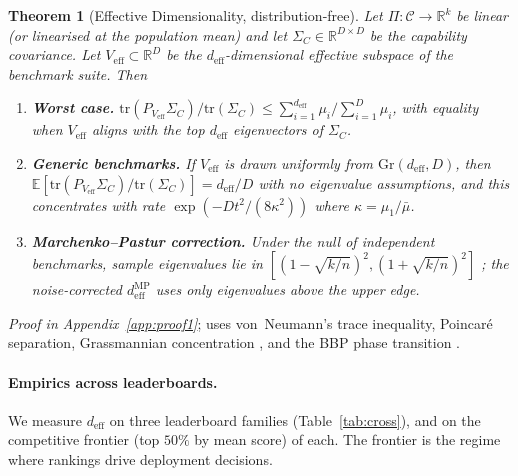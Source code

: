 \documentclass{article}
\newtheorem{theorem}{Theorem}
\begin{document}
\begin{theorem}[Effective Dimensionality, distribution-free]
\label{thm:body:deff}
Let $\Pi : \mathcal{C} \to \mathbb{R}^k$ be linear (or linearised at the
population mean) and let $\Sigma_C \in \mathbb{R}^{D \times D}$ be the
capability covariance. Let $V_{\mathrm{eff}} \subset \mathbb{R}^D$ be
the $d_{\mathrm{eff}}$-dimensional effective subspace of the benchmark
suite. Then
\begin{enumerate}[label=(\alph*), leftmargin=1.5em, itemsep=1pt]
  \item \textbf{Worst case.}
        $\mathrm{tr}(P_{V_{\mathrm{eff}}} \Sigma_C) / \mathrm{tr}(\Sigma_C)
        \le \sum_{i=1}^{d_{\mathrm{eff}}} \mu_i / \sum_{i=1}^D \mu_i$,
        with equality when $V_{\mathrm{eff}}$ aligns with the top
        $d_{\mathrm{eff}}$ eigenvectors of $\Sigma_C$.
  \item \textbf{Generic benchmarks.} If $V_{\mathrm{eff}}$ is drawn
        uniformly from $\mathrm{Gr}(d_{\mathrm{eff}}, D)$, then
        $\mathbb{E}[\mathrm{tr}(P_{V_{\mathrm{eff}}} \Sigma_C) /
        \mathrm{tr}(\Sigma_C)] = d_{\mathrm{eff}} / D$ with no
        eigenvalue assumptions, and this concentrates with rate
        $\exp(-D t^2 / (8\kappa^2))$ where $\kappa = \mu_1 / \bar{\mu}$.
  \item \textbf{Marchenko--Pastur correction.} Under the null of
        independent benchmarks, sample eigenvalues lie in
        $[(1 - \sqrt{k/n})^2, (1 + \sqrt{k/n})^2]$
        \citep{marchenko1967distribution}; the noise-corrected
        $d_{\mathrm{eff}}^{\mathrm{MP}}$ uses only eigenvalues above
        the upper edge.
\end{enumerate}
\end{theorem}

\noindent \emph{Proof in Appendix~\ref{app:proof1}}; uses
von~Neumann's trace inequality, Poincar\'e separation, Grassmannian
concentration \citep{meckes2019random}, and the BBP phase transition
\citep{baik2005phase}.

\paragraph{Empirics across leaderboards.} We measure
$d_{\mathrm{eff}}$ on three leaderboard families (Table~\ref{tab:cross}),
and on the competitive frontier (top $50\%$ by mean score) of each.
The frontier is the regime where rankings drive deployment decisions.
\end{document}
